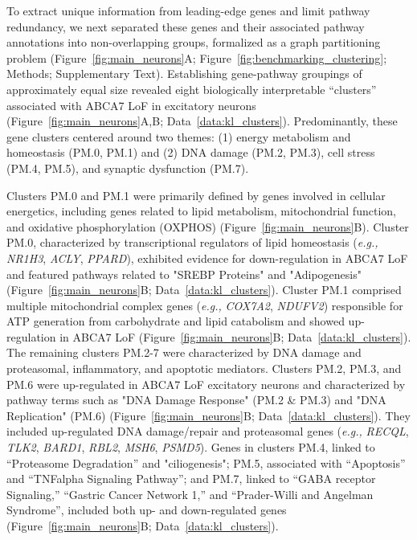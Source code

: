 To extract unique information from leading-edge genes and limit pathway redundancy, we next separated these genes and their associated pathway annotations into non-overlapping groups, formalized as a graph partitioning problem (Figure~\ref{fig:main_neurons}A; Figure~\ref{fig:benchmarking_clustering}; Methods; Supplementary Text). Establishing gene-pathway groupings of approximately equal size revealed eight biologically interpretable “clusters” associated with ABCA7 LoF in excitatory neurons (Figure~\ref{fig:main_neurons}A,B; Data~\ref{data:kl_clusters}). Predominantly, these gene clusters centered around two themes: (1) energy metabolism and homeostasis (PM.0, PM.1) and (2) DNA damage (PM.2, PM.3), cell stress (PM.4, PM.5), and synaptic dysfunction (PM.7).

Clusters PM.0 and PM.1 were primarily defined by genes involved in cellular energetics, including genes related to lipid metabolism, mitochondrial function, and oxidative phosphorylation (OXPHOS) (Figure~\ref{fig:main_neurons}B). Cluster PM.0, characterized by transcriptional regulators of lipid homeostasis (\textit{e.g.,} \textit{NR1H3}, \textit{ACLY}, \textit{PPARD}), exhibited evidence for down-regulation in ABCA7 LoF and featured pathways related to "SREBP Proteins" and "Adipogenesis" (Figure~\ref{fig:main_neurons}B; Data~\ref{data:kl_clusters}). Cluster PM.1 comprised multiple mitochondrial complex genes (\textit{e.g.,} \textit{COX7A2}, \textit{NDUFV2}) responsible for ATP generation from carbohydrate and lipid catabolism and showed up-regulation in ABCA7 LoF (Figure~\ref{fig:main_neurons}B; Data~\ref{data:kl_clusters}). The remaining clusters PM.2-7 were characterized by DNA damage and proteasomal, inflammatory, and apoptotic mediators. Clusters PM.2, PM.3, and PM.6 were up-regulated in ABCA7 LoF excitatory neurons and characterized by pathway terms such as "DNA Damage Response" (PM.2 \& PM.3) and "DNA Replication" (PM.6) (Figure~\ref{fig:main_neurons}B; Data~\ref{data:kl_clusters}). They included up-regulated DNA damage/repair and proteasomal genes (\textit{e.g.,} \textit{RECQL}, \textit{TLK2}, \textit{BARD1}, \textit{RBL2}, \textit{MSH6}, \textit{PSMD5}). Genes in clusters PM.4, linked to “Proteasome Degradation” and "ciliogenesis"; PM.5, associated with “Apoptosis” and “TNFalpha Signaling Pathway”; and PM.7, linked to “GABA receptor Signaling,” “Gastric Cancer Network 1,” and “Prader-Willi and Angelman Syndrome”,  included both up- and down-regulated genes (Figure~\ref{fig:main_neurons}B; Data~\ref{data:kl_clusters}).

